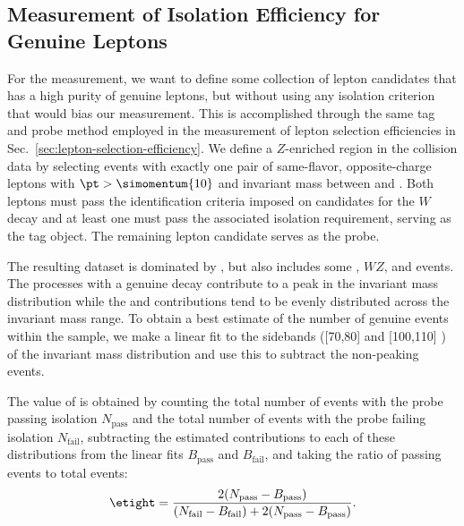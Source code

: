 \subsection{Measurement of Isolation Efficiency for Genuine Leptons}
For the \etight{} measurement, we want to define some collection of lepton candidates that has a high purity of genuine leptons, but without using any isolation criterion that would bias our measurement.  This is accomplished through the same tag and probe method employed in the measurement of lepton selection efficiencies in Sec.~\ref{sec:lepton-selection-efficiency}.  We define a $Z$-enriched region in the collision data by selecting events with exactly one pair of same-flavor, opposite-charge leptons with $\pt > \simomentum{10}$ and invariant mass between  and .  Both leptons must pass the identification criteria imposed on candidates for the $W$ decay and at least one must pass the associated isolation requirement, serving as the tag object.  The remaining lepton candidate serves as the probe.

The resulting dataset is dominated by \Zjets, but also includes some \ttbar, $WZ$, and \Wjets events.  The processes with a genuine \ztoll{} decay contribute to a peak in the invariant mass distribution while the \ttbar and \Wjets contributions tend to be evenly distributed across the invariant mass range.  To obtain a best estimate of the number of genuine \ztoll{} events within the sample, we make a linear fit to the sidebands ([70,80] and [100,110] \GeVcc) of the invariant mass distribution and use this to subtract the non-peaking events.

The value of \etight{} is obtained by counting the total number of events with the probe passing isolation $N_\text{pass}$ and the total number of events with the probe failing isolation $N_\text{fail}$, subtracting the estimated contributions to each of these distributions from the linear fits $B_\text{pass}$ and $B_\text{fail}$, and taking the ratio of passing events to total events:
\begin{equation}
  \etight = \frac{2(N_\text{pass} - B_\text{pass})}{(N_\text{fail} - B_\text{fail}) + 2(N_\text{pass} - B_\text{pass})}.
\end{equation}

